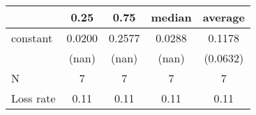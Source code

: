 \begin{tabular}{lcccc}
\hline
          &  0.25  &  0.75  & median & average   \\
\midrule
\midrule
constant  & 0.0200 & 0.2577 & 0.0288 & 0.1178    \\
          & (nan)  & (nan)  & (nan)  & (0.0632)  \\
N         & 7      & 7      & 7      & 7         \\
Loss rate & 0.11   & 0.11   & 0.11   & 0.11      \\
\hline
\end{tabular}